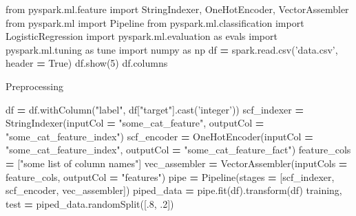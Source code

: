 \documentclass[]{book}
\newenvironment{Shaded}{\begin{snugshade}}{\end{snugshade}}
\newcommand{\DecValTok}[1]{\textcolor[rgb]{0.00,0.00,0.81}{#1}}
\newcommand{\StringTok}[1]{\textcolor[rgb]{0.31,0.60,0.02}{#1}}
\newcommand{\ImportTok}[1]{#1}
\newcommand{\VariableTok}[1]{\textcolor[rgb]{0.00,0.00,0.00}{#1}}
\newcommand{\OperatorTok}[1]{\textcolor[rgb]{0.81,0.36,0.00}{\textbf{#1}}}
\newcommand{\NormalTok}[1]{#1}
\theoremstyle{definition}
\theoremstyle{definition}
\theoremstyle{definition}
\theoremstyle{remark}
\begin{document}
\begin{Shaded}
\begin{Highlighting}[]
\ImportTok{from}\NormalTok{ pyspark.ml.feature }\ImportTok{import}\NormalTok{ StringIndexer, OneHotEncoder, VectorAssembler}
\ImportTok{from}\NormalTok{ pyspark.ml }\ImportTok{import}\NormalTok{ Pipeline}
\ImportTok{from}\NormalTok{ pyspark.ml.classification }\ImportTok{import}\NormalTok{ LogisticRegression}
\ImportTok{import}\NormalTok{ pyspark.ml.evaluation }\ImportTok{as}\NormalTok{ evals}
\ImportTok{import}\NormalTok{ pyspark.ml.tuning }\ImportTok{as}\NormalTok{ tune}
\ImportTok{import}\NormalTok{ numpy }\ImportTok{as}\NormalTok{ np}
\NormalTok{df }\OperatorTok{=}\NormalTok{ spark.read.csv(}\StringTok{'data.csv'}\NormalTok{, header }\OperatorTok{=} \VariableTok{True}\NormalTok{)}
\NormalTok{df.show(}\DecValTok{5}\NormalTok{)}
\NormalTok{df.columns}
\end{Highlighting}
\end{Shaded}

Preprocessing

\begin{Shaded}
\begin{Highlighting}[]
\NormalTok{df }\OperatorTok{=}\NormalTok{ df.withColumn(}\StringTok{"label"}\NormalTok{, df[}\StringTok{"target"}\NormalTok{].cast(}\StringTok{'integer'}\NormalTok{))}
\NormalTok{scf_indexer }\OperatorTok{=}\NormalTok{ StringIndexer(inputCol }\OperatorTok{=} \StringTok{"some_cat_feature"}\NormalTok{, outputCol }\OperatorTok{=} \StringTok{"some_cat_feature_index"}\NormalTok{)}
\NormalTok{scf_encoder }\OperatorTok{=}\NormalTok{ OneHotEncoder(inputCol }\OperatorTok{=} \StringTok{"some_cat_feature_index"}\NormalTok{, outputCol }\OperatorTok{=} \StringTok{"some_cat_feature_fact"}\NormalTok{)}
\NormalTok{feature_cols }\OperatorTok{=}\NormalTok{ [}\StringTok{"some list of column names"}\NormalTok{]}
\NormalTok{vec_assembler }\OperatorTok{=}\NormalTok{ VectorAssembler(inputCols }\OperatorTok{=}\NormalTok{ feature_cols, }
\NormalTok{                                outputCol }\OperatorTok{=} \StringTok{"features"}\NormalTok{)}
\NormalTok{pipe }\OperatorTok{=}\NormalTok{ Pipeline(stages }\OperatorTok{=}\NormalTok{ [scf_indexer, scf_encoder, vec_assembler])}
\NormalTok{piped_data }\OperatorTok{=}\NormalTok{ pipe.fit(df).transform(df)}
\NormalTok{training, test }\OperatorTok{=}\NormalTok{ piped_data.randomSplit([.}\DecValTok{8}\NormalTok{, .}\DecValTok{2}\NormalTok{])}
\end{Highlighting}
\end{Shaded}
\end{document}
